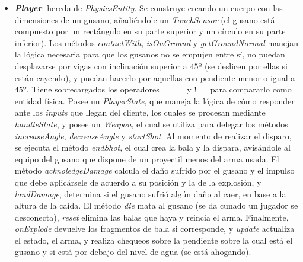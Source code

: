 \begin{itemize}
	\item \textbf{\textit{Player}}: hereda de \textit{PhysicsEntity}. Se construye creando un cuerpo con las dimensiones de un gusano, añadiéndole un \textit{TouchSensor} (el gusano está compuesto por un rectángulo en su parte superior y un círculo en su parte inferior). Los métodos \textit{contactWith}, \textit{isOnGround} y \textit{getGroundNormal} manejan la lógica necesaria para que los gusanos no se empujen entre sí, no puedan desplazarse por vigas con inclinación superior a $45º$ (se deslicen por ellas si están cayendo), y puedan hacerlo por aquellas con pendiente menor o igual a $45º$. Tiene sobrecargados los operadores $==$ y $!=$ para compararlo como entidad física. Posee un \textit{PlayerState}, que maneja la lógica de cómo responder ante los \textit{inputs} que llegan del cliente, los cuales se procesan mediante \textit{handleState}, y posee un \textit{Weapon}, el cual se utiliza para delegar los métodos \textit{increaseAngle}, \textit{decreaseAngle} y \textit{startShot}. Al momento de realizar el disparo, se ejecuta el método \textit{endShot}, el cual crea la bala y la dispara, avisándole al equipo del gusano que dispone de un proyectil menos del arma usada. El método \textit{acknoledgeDamage} calcula el daño sufrido por el gusano y el impulso que debe aplicársele de acuerdo a su posición y la de la explosión, y \textit{landDamage}, determina si el gusano sufrió algún daño al caer, en base a la altura de la caída. El método \textit{die} mata al gusano (se da cunado un jugador se desconecta), \textit{reset} elimina las balas que haya y reincia el arma. Finalmente, \textit{onExplode} devuelve los fragmentos de bala si corresponde, y \textit{update} actualiza el estado, el arma, y realiza chequeos sobre la pendiente sobre la cual está el gusano y si está por debajo del nivel de agua (se está ahogando).
\end{itemize}